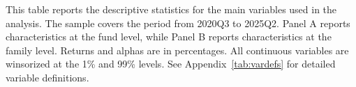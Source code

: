 \begin{table}[!ht]
    \centering
    
    \caption{Descriptive Statistics}\label{tab:descriptives}
    
    \begin{minipage}{0.95\textwidth}
        \footnotesize
        This table reports the descriptive statistics for the main variables used in the analysis. The sample covers the period from 2020Q3 to 2025Q2. Panel A reports characteristics at the fund level, while Panel B reports characteristics at the family level. Returns and alphas are in percentages. All continuous variables are winsorized at the 1\% and 99\% levels. See Appendix~\ref{tab:vardefs} for detailed variable definitions.
    \end{minipage}

    \vspace{2mm}

    
\end{table}